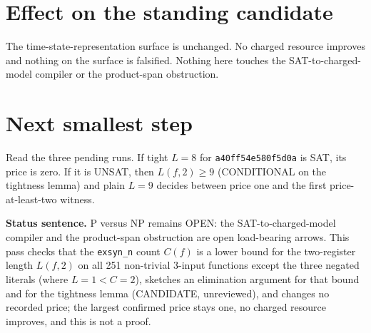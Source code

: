 \documentclass[11pt]{article}
\begin{document}
\section*{Effect on the standing candidate}
The time-state-representation surface is unchanged. No charged resource improves and nothing on the surface is falsified. Nothing here touches the SAT-to-charged-model compiler or the product-span obstruction.

\section*{Next smallest step}
Read the three pending runs. If tight $L=8$ for \texttt{a40ff54e580f5d0a} is SAT, its price is zero. If it is UNSAT, then $L(f,2)\ge 9$ (CONDITIONAL on the tightness lemma) and plain $L=9$ decides between price one and the first price-at-least-two witness.

\bigskip
\noindent\textbf{Status sentence.} P versus NP remains OPEN: the SAT-to-charged-model compiler and the product-span obstruction are open load-bearing arrows. This pass checks that the \texttt{exsyn\_n} count $C(f)$ is a lower bound for the two-register length $L(f,2)$ on all 251 non-trivial $3$-input functions except the three negated literals (where $L=1<C=2$), sketches an elimination argument for that bound and for the tightness lemma (CANDIDATE, unreviewed), and changes no recorded price; the largest confirmed price stays one, no charged resource improves, and this is not a proof.
\end{document}
